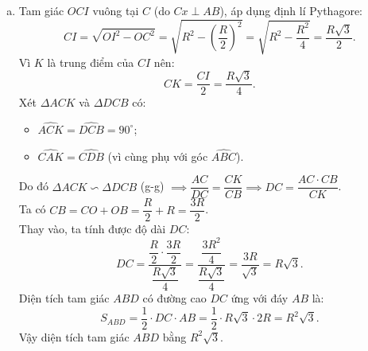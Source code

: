 \begin{bt}
{\begin{enumerate}[a)]
\begin{itemize}
		Mà $\widehat{AKC} = \widehat{NKM}$ (hai góc đối đỉnh), nên $\widehat{NMK} = \widehat{NKM}$.\\
		Suy ra tam giác $NKM$ cân tại $N$, do đó $NK = NM$.
		\item Xét $\Delta ACK$ và $\Delta AMB$ có:
		\begin{itemize}
			\item Góc $\widehat{MAB}$ chung;
			\item $\widehat{ACK} = \widehat{AMB} = 90^\circ$.
		\end{itemize}
		Do đó $\Delta ACK \backsim \Delta AMB$ (g-g) $\implies \dfrac{AC}{AM} = \dfrac{AK}{AB} \implies AK \cdot AM = AC \cdot AB$.\\
		Vì $C$ là trung điểm của bán kính $AO$ nên $AC = \dfrac{AO}{2} = \dfrac{R}{2}$.\\
		Mà đường kính $AB = 2R$, nên:
		$$AK \cdot AM = \dfrac{R}{2} \cdot 2R = R^2.$$
	\end{itemize}
	\item Tam giác $OCI$ vuông tại $C$ (do $Cx \perp AB$), áp dụng định lí Pythagore:
	$$CI = \sqrt{OI^2 - OC^2} = \sqrt{R^2 - \left(\dfrac{R}{2}\right)^2} = \sqrt{R^2 - \dfrac{R^2}{4}} = \dfrac{R\sqrt{3}}{2}.$$
	Vì $K$ là trung điểm của $CI$ nên:
	$$CK = \dfrac{CI}{2} = \dfrac{R\sqrt{3}}{4}.$$
	Xét $\Delta ACK$ và $\Delta DCB$ có:
	\begin{itemize}
		\item $\widehat{ACK} = \widehat{DCB} = 90^\circ$;
		\item $\widehat{CAK} = \widehat{CDB}$ (vì cùng phụ với góc $\widehat{ABC}$).
	\end{itemize}
	Do đó $\Delta ACK \backsim \Delta DCB$ (g-g) $\implies \dfrac{AC}{DC} = \dfrac{CK}{CB} \implies DC = \dfrac{AC \cdot CB}{CK}$.\\
	Ta có $CB = CO + OB = \dfrac{R}{2} + R = \dfrac{3R}{2}$.\\
	Thay vào, ta tính được độ dài $DC$:
	$$DC = \dfrac{\dfrac{R}{2} \cdot \dfrac{3R}{2}}{\dfrac{R\sqrt{3}}{4}} = \dfrac{\dfrac{3R^2}{4}}{\dfrac{R\sqrt{3}}{4}} = \dfrac{3R}{\sqrt{3}} = R\sqrt{3}.$$
	Diện tích tam giác $ABD$ có đường cao $DC$ ứng với đáy $AB$ là:
	$$S_{ABD} = \dfrac{1}{2} \cdot DC \cdot AB = \dfrac{1}{2} \cdot R\sqrt{3} \cdot 2R = R^2\sqrt{3}.$$
	Vậy diện tích tam giác $ABD$ bằng $R^2\sqrt{3}$.
\end{enumerate}
}
\end{bt}
